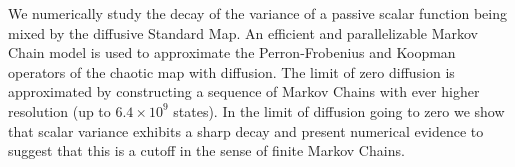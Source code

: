 % 
%

We numerically study the decay of the variance of a passive scalar
function being mixed by the diffusive Standard Map. An efficient and
parallelizable Markov Chain model is used to approximate the
Perron-Frobenius and Koopman operators of the chaotic map with
diffusion. The limit of zero diffusion is approximated by constructing
a sequence of Markov Chains with ever higher resolution (up to
$6.4 \times 10^9$ states). In the limit of diffusion going to zero we
show that scalar variance exhibits a sharp decay and present numerical
evidence to suggest that this is a cutoff in the sense of finite
Markov Chains.
